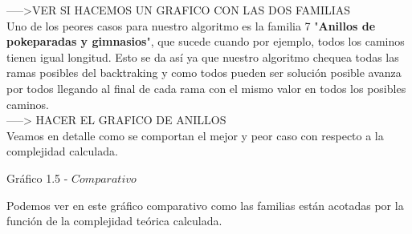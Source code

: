 ----->VER SI HACEMOS UN GRAFICO CON LAS DOS FAMILIAS \\

Uno de los peores casos para nuestro algoritmo es la familia 7 "\textbf{Anillos de pokeparadas y gimnasios}", que sucede cuando por ejemplo, todos los caminos tienen igual longitud. Esto se da as\'i ya que nuestro algoritmo chequea todas las ramas posibles del backtraking y como todos pueden ser soluci\'on posible avanza por todos llegando al final de cada rama con el mismo valor en todos los posibles caminos.\\

-----> HACER EL GRAFICO DE ANILLOS\\

Veamos en detalle como se comportan el mejor y peor caso con respecto a la complejidad calculada.\\

  \vspace*{0.3cm} \vspace*{0.3cm}
  \begin{center}
{Gr\'afico 1.5 - $Comparativo$}
  \end{center}
  \vspace*{0.3cm}

Podemos ver en este gr\'afico comparativo como las familias est\'an acotadas por la funci\'on de la complejidad te\'orica calculada.\\

